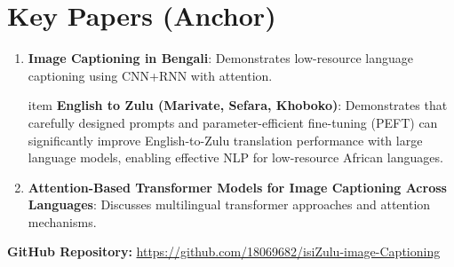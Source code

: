 \documentclass[12pt]{article}
\begin{document}
\section{Key Papers (Anchor)}
\begin{enumerate}[leftmargin=*,noitemsep]
    \item \textbf{Image Captioning in Bengali}: Demonstrates low-resource language captioning using CNN+RNN with attention.

item \textbf{English to Zulu (Marivate, Sefara, Khoboko)}: Demonstrates that carefully designed prompts and parameter-efficient fine-tuning (PEFT) can significantly improve English-to-Zulu translation performance with large language models, enabling effective NLP for low-resource African languages.
    \item \textbf{Attention-Based Transformer Models for Image Captioning Across Languages}: Discusses multilingual transformer approaches and attention mechanisms.
\end{enumerate}

\bigskip
\noindent \textbf{GitHub Repository:} \href{https://github.com/18069682/isiZulu-image-Captioning}{https://github.com/18069682/isiZulu-image-Captioning}
\end{document}
